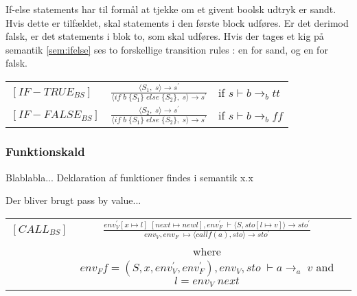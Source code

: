 If-else statements har til formål at tjekke om et givent boolsk udtryk er sandt. Hvis dette er tilfældet, skal statements i den første block udføres. Er det derimod falsk, er det statements i blok to, som skal udføres. Hvis der tages et kig på semantik \ref{sem:ifelse} ses to forskellige transition rules : en for sand, og en for falsk. 



\begin{semantik}
    \bgroup
    \def\arraystretch{3}
    \begin{table}[H]
    \centering
    \begin{tabular}{l c l}
        
        $[IF-TRUE_{BS}]$ & $
        \frac{\langle S_1,\;s\rangle  \rightarrow s^\prime}
        {\langle if\;b\;\{S_1\}\;else\;\{S_2\},\;s\rangle  \rightarrow s^\prime}
        $ & if $s \vdash b \rightarrow_b tt$ \\
        
        $[IF-FALSE_{BS}]$ & $
        \frac{\langle S_2,\;s\rangle  \rightarrow s^\prime}
        {\langle if\;b\;\{S_1\}\;else\;\{S_2\},\;s\rangle  \rightarrow s^\prime}
        $ & if $s \vdash b \rightarrow_b ff$ \\
        
    \end{tabular}
    \end{table}
    \egroup
    \caption{If-else statement}
    \label{sem:ifelse}
\end{semantik}
    
\noindent \subsubsection{Funktionskald}

Blablabla... Deklaration af funktioner findes i semantik x.x 

Der bliver brugt pass by value...


\begin{semantik}
    \bgroup
    \def\arraystretch{1.5}
    \begin{table}[H]
    \centering
    \begin{tabular}{l c l}
        
        $[CALL_{BS}]$ & 
        $ \frac
        {
            env_V^\prime [x \mapsto l]\;[next \mapsto new l], env_F^\prime\;\vdash \langle S, sto[l \mapsto v] \rangle \rightarrow sto^\prime
        }
        {
            env_V, env_F\;\mapsto \langle call f(a), sto \rangle \rightarrow sto^\prime
        } $ & \\
        
        & where $ env_F f = (S, x, env_V^\prime, env_F^\prime), env_V, sto\;\vdash a \rightarrow_a\;v$ and $l = env_V\;next $&
        
    \end{tabular}
    \end{table}
    \egroup
    \caption{Funktionskald}
    \label{sem:funktionskald}
\end{semantik}

